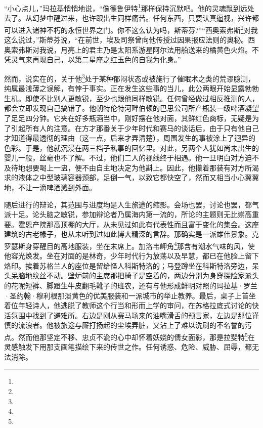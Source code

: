 “小心点儿，”玛拉基悄悄地说，“像德鲁伊特\footnote{}那样保持沉默吧。他的灵魂飘到远处去了。从幻梦中醒过来，也许跟出生同样痛苦。任何东西，只要认真逼视，兴许都可以进入诸神不朽的永恒世界之门。你不这么认为吗，斯蒂芬?”“西奥索弗斯\footnote{}对我这么说过，”斯蒂芬说，“在前世，埃及司祭曾向他传授过因果报应法则的奥秘。西奥索弗斯对我说，月亮上的君主乃是太阳系游星阿尔法用船送来的橘黄色火焰。不凭灵气来再现自己，以第二星座之红玉色的自我为化身。”
\par 然而，说实在的，关于他\footnote{}处于某种郁闷状态或被施行了催眠术之类的荒谬臆测，纯属最浅薄之误解，有悖于事实。正在发生这些事的当儿，此公两眼开始显露勃勃生机。即使不比别人更敏锐，至少也跟他同样敏锐。任何曾经做过相反推测的人，都会立即发现自己搞错了。他朝特伦特河畔伯顿的巴思公司所产瓶装一级啤酒凝望了足足四分钟。它夹在好多瓶酒当中，刚好摆在他对面，其鲜红色商标，无疑是为了引起所有人的注意。在方才那番关于少年时代和赛马的谈话后，由于只有他自己才知道得最透彻的理由（这一点，后来才弄清楚），周围发生的事被涂上了迥异的色彩。于是，他就沉浸在两三档子私事的回忆里。对此，另两个人犹如尚未出生的婴儿一般，丝毫也不了解。不过，他们二人的视线终于相遇。他一旦明白对方迫不及待地想要喝上一盅，便不由自主地决定为他斟上。因此，他攥着那装有对方所渴求的液体之中型玻璃容器颈部，足倒一气，以致它都快空了，然而又相当小心翼翼地，不让一滴啤酒溅到外面。
\par 随后进行的辩论，其范围与进度均是人生旅途的缩影。会场也罢，讨论也罢，都气派十足。论头脑之敏锐，参加辩论者乃属海内第一流的，所论的主题则无比崇高重要。霍恩产院那高顶棚的大厅，从未见过如此有代表性而且富于变化的集会。这座建筑的古老椽子，也从未听到过如此博大精深的言辞。那确实是一派雄伟景象。克罗瑟斯身穿醒目的高地服装，坐在末席上。加洛韦岬角\footnote{}那含有潮水气味的风，使他容光焕发。坐在对面的是林奇，少年时代行为放荡以及早慧，都已在他脸上留下烙印。挨着苏格兰人的座位是留给怪人科斯特洛的；马登蹲坐在科斯特洛旁边，呆头呆脑地纹丝不动。壁炉前的主席那把椅子是空着的，两边分别为身穿探险家派头的花呢短裤、脚蹬生牛皮翻毛靴子的班农，还有与他形成鲜明对照的玛拉基·罗兰·圣约翰·穆利根那淡黄色的优美服装和一派城市的举止教养。最后，桌子上首坐着位年轻诗人，他逃脱了教师这个行当和形而上学的审问，在苏格拉底式讨论的快活氛围中找到了避难所。右边是刚从赛马场来的油嘴滑舌的预言家，左边是那位谨慎的流浪者。他被旅途与厮打扬起的尘埃弄脏，又沾上了难以洗刷的不名誉的污点。然而他那坚定不移、忠贞不渝的心中却怀着妖娆的倩女面影，那是拉斐特\footnote{}在灵感触发下用那支画笔描绘下来的传世之作。任何诱惑、危险、威胁、屈辱，都无法消除。
